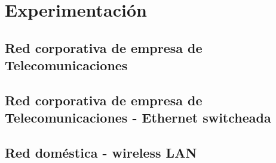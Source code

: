 \section{Experimentación}

\subsection{Red corporativa de empresa de Telecomunicaciones}

\newpage


\newpage

\subsection{Red corporativa de empresa de Telecomunicaciones - Ethernet switcheada}

\newpage

\subsection{Red doméstica - wireless LAN}

\newpage